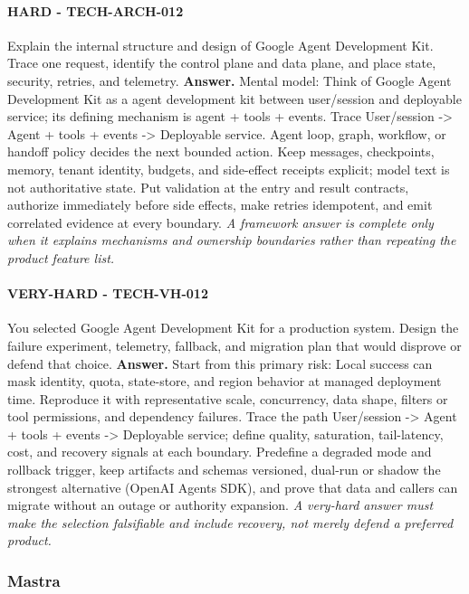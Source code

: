 \paragraph{HARD - TECH-ARCH-012} Explain the internal structure and design of Google Agent Development Kit. Trace one request, identify the control plane and data plane, and place state, security, retries, and telemetry.
\textbf{Answer.} Mental model: Think of Google Agent Development Kit as a agent development kit between user/session and deployable service; its defining mechanism is agent + tools + events. Trace User/session -> Agent + tools + events -> Deployable service. Agent loop, graph, workflow, or handoff policy decides the next bounded action. Keep messages, checkpoints, memory, tenant identity, budgets, and side-effect receipts explicit; model text is not authoritative state. Put validation at the entry and result contracts, authorize immediately before side effects, make retries idempotent, and emit correlated evidence at every boundary.
\textit{A framework answer is complete only when it explains mechanisms and ownership boundaries rather than repeating the product feature list.}
\paragraph{VERY-HARD - TECH-VH-012} You selected Google Agent Development Kit for a production system. Design the failure experiment, telemetry, fallback, and migration plan that would disprove or defend that choice.
\textbf{Answer.} Start from this primary risk: Local success can mask identity, quota, state-store, and region behavior at managed deployment time. Reproduce it with representative scale, concurrency, data shape, filters or tool permissions, and dependency failures. Trace the path User/session -> Agent + tools + events -> Deployable service; define quality, saturation, tail-latency, cost, and recovery signals at each boundary. Predefine a degraded mode and rollback trigger, keep artifacts and schemas versioned, dual-run or shadow the strongest alternative (OpenAI Agents SDK), and prove that data and callers can migrate without an outage or authority expansion.
\textit{A very-hard answer must make the selection falsifiable and include recovery, not merely defend a preferred product.}
\subsubsection*{Mastra}
